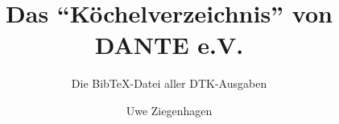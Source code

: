 \documentclass[ngerman]{beamer}
\author{Uwe Ziegenhagen}
\title{Das \enquote{Köchelverzeichnis} von DANTE e.V.}
\subtitle{Die Bib\TeX-Datei aller DTK-Ausgaben}
\begin{document}
\begin{frame}

\maketitle

\end{frame}
\end{document}
